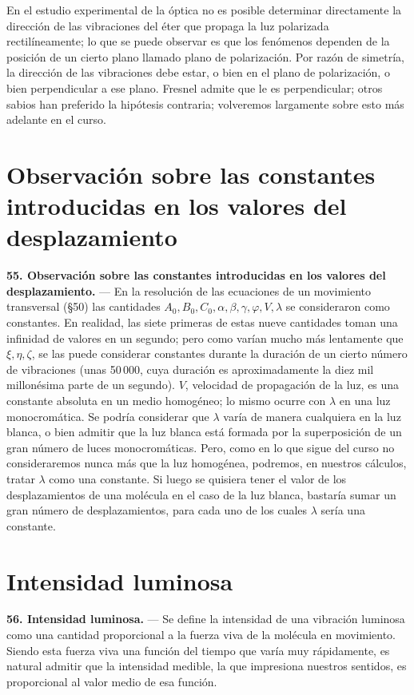 En el estudio experimental de la óptica no es posible determinar
directamente la dirección de las vibraciones del éter que propaga la luz
polarizada rectilíneamente; lo que se puede observar es que los
fenómenos dependen de la posición de un cierto plano llamado plano de
polarización. Por razón de simetría, la dirección de las vibraciones
debe estar, o bien en el plano de polarización, o bien perpendicular a
ese plano. Fresnel admite que le es perpendicular; otros sabios han
preferido la hipótesis contraria; volveremos largamente sobre esto más
adelante en el curso.

\section{Observación sobre las constantes introducidas en los valores del
desplazamiento}

\noindent\textbf{55. Observación sobre las constantes introducidas en los
valores del desplazamiento.} — En la resolución de las ecuaciones de un
movimiento transversal (§50) las cantidades
$A_0,B_0,C_0,\alpha,\beta,\gamma,\varphi,V,\lambda$ se consideraron como
constantes. En realidad, las siete primeras de estas nueve cantidades toman una
infinidad de valores en un segundo; pero como varían mucho más lentamente
que $\xi,\eta,\zeta$, se las puede considerar constantes durante la
duración de un cierto número de vibraciones (unas 50\,000, cuya duración
es aproximadamente la diez mil millonésima parte de un segundo). $V$,
velocidad de propagación de la luz, es una constante absoluta en un medio
homogéneo; lo mismo ocurre con $\lambda$ en una luz monocromática. Se
podría considerar que $\lambda$ varía de manera cualquiera en la luz
blanca, o bien admitir que la luz blanca está formada por la
superposición de un gran número de luces monocromáticas. Pero, como en lo
que sigue del curso no consideraremos nunca más que la luz homogénea,
podremos, en nuestros cálculos, tratar $\lambda$ como una constante. Si
luego se quisiera tener el valor de los desplazamientos de una molécula
en el caso de la luz blanca, bastaría sumar un gran número de
desplazamientos, para cada uno de los cuales $\lambda$ sería una
constante.

\section{Intensidad luminosa}

\noindent\textbf{56. Intensidad luminosa.} — Se define la intensidad de
una vibración luminosa como una cantidad proporcional a la fuerza viva de
la molécula en movimiento. Siendo esta fuerza viva una función del tiempo
que varía muy rápidamente, es natural admitir que la intensidad medible,
la que impresiona nuestros sentidos, es proporcional al valor medio de
esa función.

